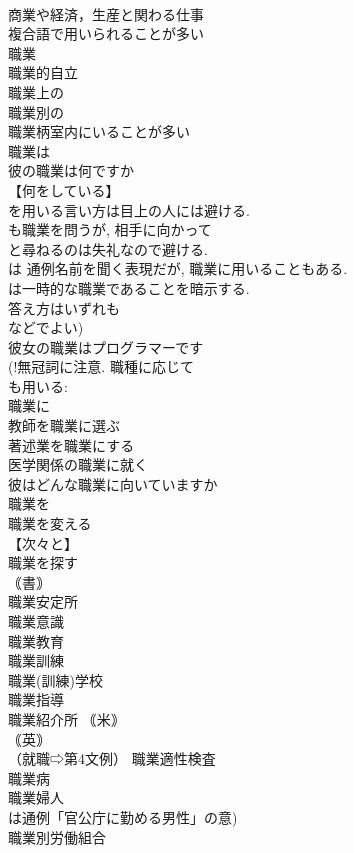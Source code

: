 \documentclass[8pt]{extreport}
\begin{document}
\begin{CJK}{UTF8}{min}
\\	商業や経済，生産と関わる仕事
\\	複合語で用いられることが多い
\\	職業~ 
\\	職業的自立 
\\	職業上の 
\\	職業別の 
\\	職業柄室内にいることが多い 
\\	職業は 
\\	彼の職業は何ですか 
\\	【何をしている】
\\	を用いる言い方は目上の人には避ける. 
\\	も職業を問うが, 相手に向かって 
\\	と尋ねるのは失礼なので避ける. 
\\	は 通例名前を聞く表現だが, 職業に用いることもある. 
\\	は一時的な職業であることを暗示する. 
\\	答え方はいずれも 
\\	などでよい) 
\\	彼女の職業はプログラマーです 
\\	(!無冠詞に注意. 職種に応じて 
\\	も用いる: 
\\	職業に 
\\	教師を職業に選ぶ 
\\	著述業を職業にする 
\\	医学関係の職業に就く 
\\	彼はどんな職業に向いていますか 
\\	職業を 
\\	職業を変える 
\\	【次々と】
\\	職業を探す 
\\	｟書｠
\\	職業安定所 
\\	職業意識 
\\	職業教育 
\\	職業訓練 
\\	職業(訓練)学校 
\\	職業指導 
\\	職業紹介所 ｟米｠
\\	｟英｠
\\	（就職⇨第4文例） 職業適性検査 
\\	職業病 
\\	職業婦人 
\\	は通例「官公庁に勤める男性」の意) 
\\	職業別労働組合 

\end{CJK}
\end{document}
